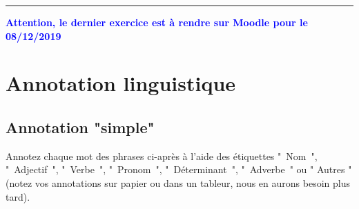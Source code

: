 
\newcommand{\numTD}{TD7}
\newcommand{\themeTD}{Annotation et Evaluation}


\hrule

\noindent{}

\textcolor{blue}{\textbf{Attention, le dernier exercice est à rendre sur Moodle pour le 08/12/2019}}

\section{Annotation linguistique}



  \subsection{Annotation "simple"}

 Annotez chaque mot des phrases ci-après à l'aide des étiquettes " Nom ", " Adjectif ", " Verbe ", " Pronom ", " Déterminant ", " Adverbe " ou " Autres " (notez vos annotations  sur papier ou dans un tableur, nous en aurons besoin plus tard).

